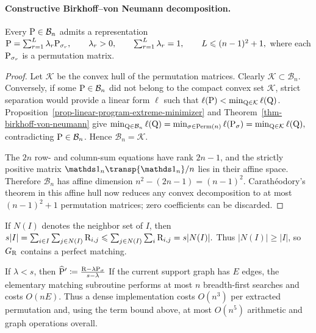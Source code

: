 \paragraph{Constructive Birkhoff--von Neumann decomposition.}
\begin{cor}\label{cor-birkhoff-von-neumann-decomposition}
Every $\P\in\mathcal B_n$ admits a representation
\(\P=\sum_{r=1}^{L}\lambda_r\P_{\sigma_r}, \qquad \lambda_r>0, \qquad \sum_{r=1}^{L}\lambda_r=1, \qquad L\leq (n-1)^2+1,\)
where each $\P_{\sigma_r}$ is a permutation matrix.
\end{cor}
\begin{proof}
Let $\mathcal K$ be the convex hull of the permutation matrices. Clearly $\mathcal K\subset\mathcal B_n$. Conversely, if some $\P\in\mathcal B_n$ did not belong to the compact convex set $\mathcal K$, strict separation would provide a linear form $\ell$ such that $\ell(\P)<\min_{\Q\in\mathcal K}\ell(\Q)$. Proposition~\ref{prop-linear-program-extreme-minimizer} and Theorem~\ref{thm-birkhoff-von-neumann} give
\(\min_{\Q\in\mathcal B_n}\ell(\Q) =\min_{\sigma\in\Perm(n)}\ell(\P_\sigma) =\min_{\Q\in\mathcal K}\ell(\Q),\)
contradicting $\P\in\mathcal B_n$. Hence $\mathcal B_n=\mathcal K$.

The $2n$ row- and column-sum equations have rank $2n-1$, and the strictly positive matrix $\ones_n\transp{\ones_n}/n$ lies in their affine space. Therefore $\mathcal B_n$ has affine dimension $n^2-(2n-1)=(n-1)^2$. Carath\'eodory's theorem in this affine hull now reduces any convex decomposition to at most $(n-1)^2+1$ permutation matrices; zero coefficients can be discarded.
\end{proof}
If $N(I)$ denotes the neighbor set of $I$, then
\(s|I| =\sum_{i\in I}\sum_{j\in N(I)}\R_{i,j} \leq\sum_{j\in N(I)}\sum_i\R_{i,j} =s|N(I)|.\)
Thus $|N(I)|\geq |I|$, so $G_{\R}$ contains a perfect matching.

If $\lambda<s$, then
\(\widehat\P' \eqdef \frac{\R-\lambda\P_\sigma}{s-\lambda}\)
If the current support graph has $E$ edges, the elementary matching subroutine performs at most $n$ breadth-first searches and costs $O(nE)$. Thus a dense implementation costs $O(n^3)$ per extracted permutation and, using the term bound above, at most $O(n^5)$ arithmetic and graph operations overall.

